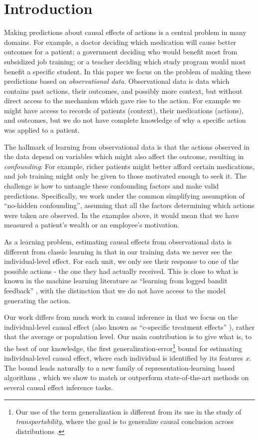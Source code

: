 \section{Introduction}\label{sec:intro}

Making predictions about causal effects of actions is a central problem in many domains. For example, a doctor deciding which medication will cause better outcomes for a patient; a government deciding who would benefit most from subsidized job training; or a teacher deciding which study program would most benefit a specific student. In this paper we focus on the problem of making these predictions based on \emph{observational data}. Observational data is data which contains past actions, their outcomes, and possibly more context, but without direct access to the mechanism which gave rise to the action. For example we might have access to records of patients (context), their medications (actions), and outcomes, but we do not have complete knowledge of why a specific action was applied to a patient.

The hallmark of learning from observational data is that the actions observed in the data depend on variables which might also affect the outcome, resulting in \emph{confounding}: For example, richer patients might better afford certain medications, and job training might only be given to those motivated enough to seek it. The challenge is how to untangle these confounding factors and make valid predictions. Specifically, we work under the common simplifying assumption of ``no-hidden confounding'', assuming that all the factors determining which actions were taken are observed. In the examples above, it would mean that we have measured a patient's wealth or an employee's motivation.

As a learning problem, estimating causal effects from observational data is different from classic learning in that in our training data we never see the individual-level effect. For each unit, we only see their response to one of the possible actions - the one they had actually received. This is close to what is known in the machine learning literature as ``learning from logged bandit feedback'' \citep{strehl2010learning,swaminathan2015batch}, with the distinction that we do not have access to the model generating the action.


Our work differs from much work in causal inference in that we focus on the individual-level causal effect (also known as ``c-specific treatment effects'' \citet{shpitser2006ident,pearl2015detecting}), rather that the average or population level. Our main contribution is to give what is, to the best of our knowledge, the first generalization-error\footnote{Our use of the term generalization is different from its use in the study of \emph{transportability}, where the goal is to generalize causal conclusion across distributions \citep{bareinboim2016causal}.} bound for estimating individual-level causal effect, where each individual is identified by its features $x$. The bound leads naturally to a new family of representation-learning based algorithms \cite{bengio2013representation}, which we show to match or outperform state-of-the-art methods on several causal effect inference tasks.


